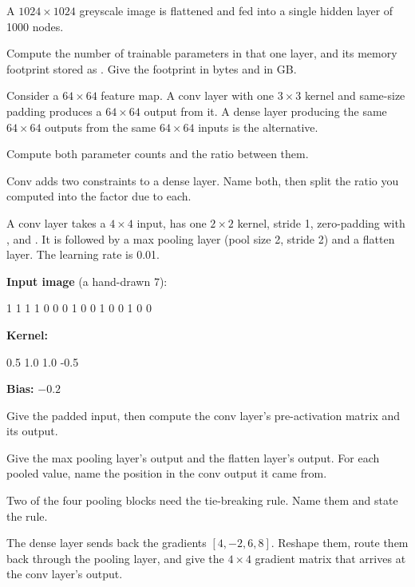  A $1024 \times 1024$ greyscale image is flattened and fed into a single hidden layer of
1000 nodes.

Compute the number of trainable parameters in that one layer, and its memory footprint stored as
. Give the footprint in bytes and in GB. 

 Consider a $64 \times 64$ feature map. A conv layer with one $3 \times 3$ kernel and
same-size padding produces a $64 \times 64$ output from it. A dense layer producing the same
$64 \times 64$ outputs from the same $64 \times 64$ inputs is the alternative.

Compute both parameter counts and the ratio between them.

Conv adds two constraints to a dense layer. Name both, then split the ratio you computed into the
factor due to each. 

\label{exa:q:7}

A conv layer takes a $4 \times 4$ input, has one $2 \times 2$ kernel, stride 1, zero-padding with
, and . It is followed by a max pooling layer (pool
size 2, stride 2) and a flatten layer. The learning rate is 0.01.

\textbf{Input image} (a hand-drawn 7):

\begin{console}
1 1 1 1
0 0 0 1
0 0 1 0
0 1 0 0
\end{console}

\noindent\textbf{Kernel:}

\begin{console}
0.5   1.0
1.0  -0.5
\end{console}

\noindent\textbf{Bias:} $-0.2$

 Give the padded input, then compute the conv layer's pre-activation matrix and its output.

 Give the max pooling layer's output and the flatten layer's output. For each pooled value,
name the position in the conv output it came from.

Two of the four pooling blocks need the tie-breaking rule. Name them and state the rule. 

 The dense layer sends back the gradients $[4, -2, 6, 8]$. Reshape them, route them back
through the pooling layer, and give the $4 \times 4$ gradient matrix that arrives at the conv layer's
output. 

